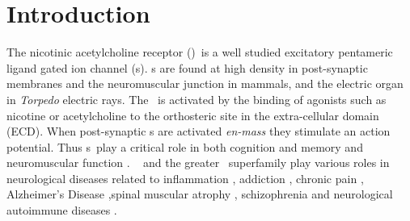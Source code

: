 %


\section{Introduction}
\label{Intro}

The nicotinic acetylcholine receptor (\nachr)~is a well studied excitatory pentameric ligand gated ion channel (\plgic s). \nachr s are found at high density in post-synaptic membranes and the neuromuscular junction in mammals, and the electric organ in \textit{Torpedo} electric rays. The \nachr~is activated by the binding of agonists such as nicotine or acetylcholine to the orthosteric site in the extra-cellular domain (ECD). When post-synaptic \nachr s are activated {\it en-mass} they stimulate an action potential. Thus \nachr s~play a critical role in both cognition and memory\cite{Henault2015} and neuromuscular function \cite{Mukhtasimova2016,Kalamida2007}. \nachr~ and the greater \plgic~superfamily play various roles in neurological diseases related to inflammation \cite{Taly2009,Patel2017,Yocum2017,Egea2015},  addiction \cite{Cornelison2016}, chronic pain \cite{Xiong2012}, Alzheimer's Disease \cite{Walstab2010,Picciotto_Neuroprotection_2008,MartinRuiz_4_1999,Kalamida2007},spinal muscular atrophy \cite{Arnold_Reduced_2004}, schizophrenia \cite{Haydar2010,Kalamida2007} and neurological autoimmune diseases \cite{Lennon_Immunization_2003, Kumari2008}.

